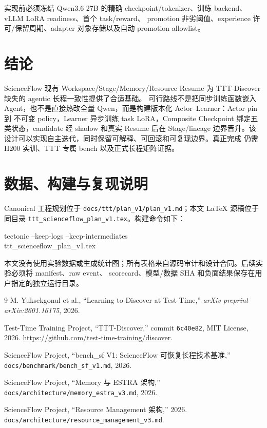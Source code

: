 \documentclass[UTF8,11pt,a4paper]{ctexart}
\begin{document}
实现前必须冻结 Qwen3.6 27B 的精确 checkpoint/tokenizer、训练 backend、vLLM LoRA readiness、首个 task/reward、
promotion 非劣阈值、experience 许可/保留周期、adapter 对象存储以及自动 promotion allowlist。

\section{结论}

ScienceFlow 现有 Workspace/Stage/Memory/Resource Resume 为 TTT-Discover 缺失的 agentic 长程一致性提供了合适基础。
可行路线不是把同步训练函数嵌入 Agent，也不是直接热改全量 Qwen，而是构建版本化 Actor--Learner：Actor pin 到
不可变 policy，Learner 异步训练 task LoRA，Composite Checkpoint 绑定五类状态，candidate 经 shadow 和真实
Resume 后在 Stage/lineage 边界晋升。该设计可以实现自主迭代，同时保留可解释、可回滚和可复现边界。真正完成
仍需 H200 实训、TTT 专属 bench 以及正式长程矩阵证据。

\section*{数据、构建与复现说明}

Canonical 工程规划位于 \nolinkurl{docs/ttt/plan_v1/plan_v1.md}；本文 LaTeX 源稿位于同目录
\nolinkurl{ttt_scienceflow_plan_v1.tex}。构建命令如下：

\begin{center}
\small\ttfamily
tectonic --keep-logs --keep-intermediates\\
ttt\_scienceflow\_plan\_v1.tex
\end{center}
本文没有使用实验数据或生成统计图；所有表格来自源码审计和设计合同。后续实验必须将 manifest、raw event、
scorecard、模型/数据 SHA 和负面结果保存在用户指定的独立运行目录。

\begin{thebibliography}{9}
M. Yuksekgonul et al., ``Learning to Discover at Test Time,''
\emph{arXiv preprint arXiv:2601.16175}, 2026.

Test-Time Training Project, ``TTT-Discover,'' commit \nolinkurl{6c40e82},
MIT License, 2026.
\url{https://github.com/test-time-training/discover}.

ScienceFlow Project, ``bench\_sf V1: ScienceFlow 可恢复长程技术基准,''
\nolinkurl{docs/benchmark/bench_sf_v1.md}, 2026.

ScienceFlow Project, ``Memory 与 ESTRA 架构,''
\nolinkurl{docs/architecture/memory_estra_v3.md}, 2026.

ScienceFlow Project, ``Resource Management 架构,'' 2026.\newline
\nolinkurl{docs/architecture/resource_management_v3.md}.
\end{thebibliography}
\end{document}
